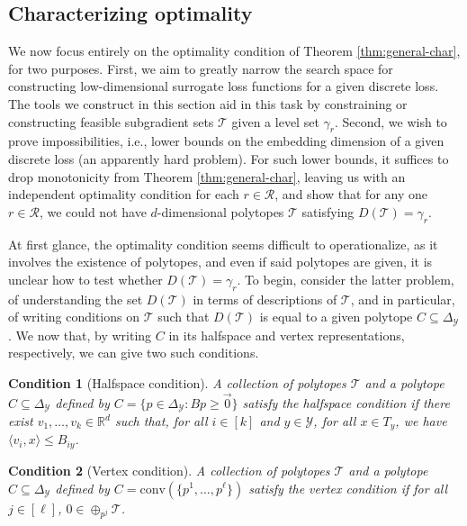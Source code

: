 \documentclass[anon]{colt2020} %
\newcommand{\reals}{\mathbb{R}}
\newcommand{\simplex}{\Delta_\Y}
\newcommand{\R}{\mathcal{R}}
\newcommand{\T}{\mathcal{T}}
\newcommand{\Y}{\mathcal{Y}}
\newcommand{\inprod}[2]{\langle #1, #2 \rangle}%
\newcommand{\conv}{\mathrm{conv}}
\newtheorem{condition}{Condition}
\begin{document}
\subsection{Characterizing optimality}\label{subsec:opt-conditions}

We now focus entirely on the optimality condition of Theorem \ref{thm:general-char}, for two purposes.
First, we aim to greatly narrow the search space for constructing low-dimensional surrogate loss functions for a given discrete loss.
The tools we construct in this section aid in this task by constraining or constructing feasible subgradient sets $\T$ given a level set $\gamma_r$.
Second, we wish to prove impossibilities, i.e., lower bounds on the embedding dimension of a given discrete loss (an apparently hard problem).
For such lower bounds, it suffices to drop monotonicity from Theorem \ref{thm:general-char}, leaving us with an independent optimality condition for each $r\in\R$, and show that for any one $r\in\R$, we could not have $d$-dimensional polytopes $\T$ satisfying $D(\T) = \gamma_r$.

At first glance, the optimality condition seems difficult to operationalize, as it involves the existence of polytopes, and even if said polytopes are given, it is unclear how to test whether $D(\T)=\gamma_r$.
To begin, consider the latter problem, of understanding the set $D(\T)$ in terms of descriptions of $\T$, and in particular, of writing conditions on $\T$ such that $D(\T)$ is equal to a given polytope $C\subseteq\simplex$.
We now that, by writing $C$ in its halfspace and vertex representations, respectively, we can give two such conditions.

\begin{condition}[Halfspace condition]\label{cond:H-condition}
	A collection of polytopes $\T$ and a polytope $C\subseteq\simplex$ defined by $C = \{p \in \simplex : Bp \geq \vec 0\}$ \emph{satisfy the halfspace condition} if there exist $v_1, \ldots, v_k \in \reals^d$ such that, for all $i \in [k]$ and $y \in \Y$, for all $x \in T_y$, we have $\inprod{v_i}{x} \leq B_{iy}$.
\end{condition}
\begin{condition}[Vertex condition]\label{cond:V-condition}
	A collection of polytopes $\T$ and a polytope $C\subseteq\simplex$ defined by $C = \conv(\{p^1, \ldots, p^\ell\})$ \emph{satisfy the vertex condition} if for all $j \in [\ell]$, $0 \in \oplus_{p^j} \T$. %
\end{condition}
\end{document}
